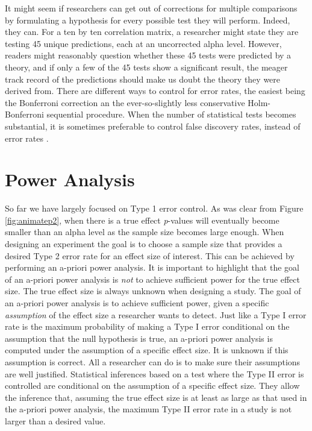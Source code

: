 \documentclass[
]{krantz}
\begin{document}
It might seem if researchers can get out of corrections for multiple comparisons by formulating a hypothesis for every possible test they will perform. Indeed, they can. For a ten by ten correlation matrix, a researcher might state they are testing 45 unique predictions, each at an uncorrected alpha level. However, readers might reasonably question whether these 45 tests were predicted by a theory, and if only a few of the 45 tests show a significant result, the meager track record of the predictions should make us doubt the theory they were derived from. There are different ways to control for error rates, the easiest being the Bonferroni correction an the ever-so-slightly less conservative Holm-Bonferroni sequential procedure. When the number of statistical tests becomes substantial, it is sometimes preferable to control false discovery rates, instead of error rates \citep{benjamini_controlling_1995}.

\hypertarget{power-analysis}{%
\section{Power Analysis}\label{power-analysis}}

So far we have largely focused on Type 1 error control. As was clear from Figure \ref{fig:animatep2}, when there is a true effect \emph{p}-values will eventually become smaller than an alpha level as the sample size becomes large enough. When designing an experiment the goal is to choose a sample size that provides a desired Type 2 error rate for an effect size of interest. This can be achieved by performing an a-priori power analysis. It is important to highlight that the goal of an a-priori power analysis is \emph{not} to achieve sufficient power for the true effect size. The true effect size is always unknown when designing a study. The goal of an a-priori power analysis is to achieve sufficient power, given a specific \emph{assumption} of the effect size a researcher wants to detect. Just like a Type I error rate is the maximum probability of making a Type I error conditional on the assumption that the null hypothesis is true, an a-priori power analysis is computed under the assumption of a specific effect size. It is unknown if this assumption is correct. All a researcher can do is to make sure their assumptions are well justified. Statistical inferences based on a test where the Type II error is controlled are conditional on the assumption of a specific effect size. They allow the inference that, assuming the true effect size is at least as large as that used in the a-priori power analysis, the maximum Type II error rate in a study is not larger than a desired value.
\end{document}
